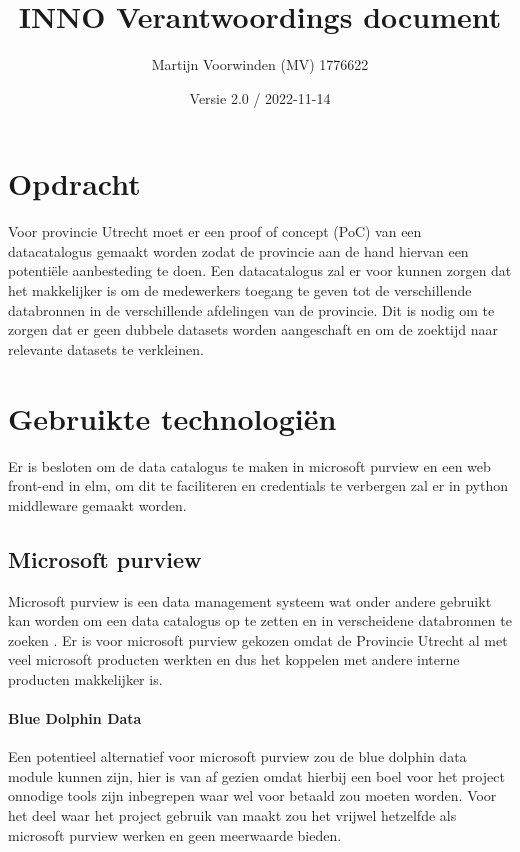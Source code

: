 \documentclass[12pt, a4paper]{report}
\title{INNO Verantwoordings document}
\author{Martijn Voorwinden (MV)   1776622}
\date{Versie 2.0 / 2022-11-14}
\begin{document}
    \maketitle
    \begin{versionhistory}
    \end{versionhistory}
    \newpage
    \tableofcontents
    \chapter{Opdracht}
    Voor provincie Utrecht moet er een proof of concept (PoC) van een \\
    datacatalogus gemaakt worden zodat de provincie aan de hand hiervan een potentiële aanbesteding te doen.  
    Een datacatalogus zal er voor kunnen zorgen dat het makkelijker is om de medewerkers toegang te geven tot de verschillende databronnen in de verschillende afdelingen van de provincie. 
    Dit is nodig om te zorgen dat er geen dubbele datasets worden aangeschaft en om de zoektijd naar relevante datasets te verkleinen.

    \chapter{Gebruikte technologiën}
    Er is besloten om de data catalogus te maken in microsoft purview en een web front-end in elm,
    om dit te faciliteren en credentials te verbergen zal er in python middleware gemaakt worden.
    \section{Microsoft purview}
    Microsoft purview is een data management systeem wat onder andere gebruikt kan worden om een data catalogus op te zetten en in verscheidene databronnen te zoeken \cite{purview}.
    Er is voor microsoft purview gekozen omdat de Provincie Utrecht al met veel microsoft producten werkten en dus het koppelen met andere interne \\ producten makkelijker is.
    \subsubsection*{Blue Dolphin Data}
    Een potentieel alternatief voor microsoft purview zou de blue dolphin data module \cite{blue-dolphin} kunnen zijn,
    hier is van af gezien omdat hierbij een boel voor het project onnodige tools zijn inbegrepen waar wel voor betaald zou moeten worden.
    Voor het deel waar het project gebruik van maakt zou het vrijwel hetzelfde als microsoft purview werken en geen meerwaarde bieden.
\end{document}
